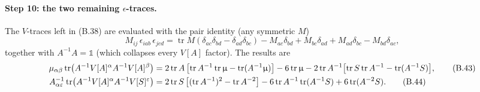 \paragraph{Step 10: the two remaining $\epsilon$-traces.}
The $V$-traces left in (B.38) are evaluated with the pair identity (any symmetric $M$)
\begin{equation}
M_{ij}\,\epsilon_{iab}\,\epsilon_{jcd}
=\operatorname{tr}M(\delta_{ac}\delta_{bd}-\delta_{ad}\delta_{bc})
-M_{ac}\delta_{bd}+M_{bc}\delta_{ad}+M_{ad}\delta_{bc}-M_{bd}\delta_{ac} , \tag{B.42}
\end{equation}
together with $A^{-1}A=\mathbb 1$ (which collapses every $V[A]$ factor). The results are
\begin{align}
\mu_{\alpha\beta}\operatorname{tr}\bigl(A^{-1}V[A]^{\alpha}A^{-1}V[A]^{\beta}\bigr)
&=2\operatorname{tr}A\,\bigl[\operatorname{tr}A^{-1}\operatorname{tr}\upmu-\operatorname{tr}(A^{-1}\upmu)\bigr]
-6\operatorname{tr}\upmu-2\operatorname{tr}A^{-1}\bigl[\operatorname{tr}S\operatorname{tr}A^{-1}-\operatorname{tr}(A^{-1}S)\bigr], \tag{B.43}\\
A^{-1}_{\alpha\varepsilon}\operatorname{tr}\bigl(A^{-1}V[A]^{\alpha}A^{-1}V[S]^{\varepsilon}\bigr)
&=2\operatorname{tr}S\,\bigl[(\operatorname{tr}A^{-1})^{2}-\operatorname{tr}A^{-2}\bigr]
-6\operatorname{tr}A^{-1}\operatorname{tr}(A^{-1}S)+6\operatorname{tr}(A^{-2}S) . \tag{B.44}
\end{align}

